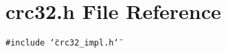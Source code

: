 \section{crc32.h File Reference}
\label{crc32_8h}
{\tt \#include \char`\"{}crc32\_\-impl.h\char`\"{}}\par
